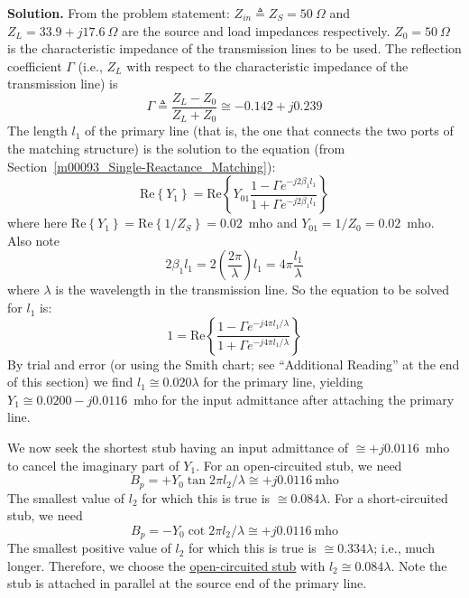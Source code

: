 \begin{example}
\begin{mdframed}[backgroundcolor=brown!20,linecolor=brown!20]
{\bf Solution.}
From the problem statement: $Z_{in} \triangleq Z_S = 50~\Omega$ and $Z_L = 33.9+j17.6~\Omega$ are the source and load impedances respectively.
$Z_0=50~\Omega$ is the characteristic impedance of the transmission lines to be used.
The reflection coefficient $\Gamma$ (i.e., $Z_L$ with respect to the characteristic impedance of the transmission line) is
%
\begin{equation}
\Gamma \triangleq \frac{Z_L - Z_0}{Z_L + Z_0} \cong -0.142 + j0.239
\end{equation} 
%
The length $l_1$ of the primary line (that is, the one that connects the two ports of the matching structure) is the solution to the equation (from Section~\ref{m00093_Single-Reactance_Matching}):
%
\begin{equation}
\mbox{Re}\left\{Y_1\right\} = \mbox{Re}\left\{Y_{01} \frac{ 1 - \Gamma e^{-j2\beta_1 l_1} }{ 1 + \Gamma e^{-j2\beta_1 l_1} }\right\}
\end{equation}
% 
where here
$\mbox{Re}\left\{Y_1\right\}=\mbox{Re}\left\{1/Z_S\right\}=0.02$~mho and 
$Y_{01} = 1/Z_0 = 0.02$~mho.
Also note
%
\begin{equation}
2\beta_1 l_1 = 2 \left(\frac{2\pi}{\lambda}\right) l_1 = 4\pi \frac{l_1}{\lambda}
\end{equation}
%
where $\lambda$ is the wavelength in the transmission line.
So the equation to be solved for $l_1$ is:
%
\begin{equation}
1 = \mbox{Re}\left\{ 
           \frac{ 1-\Gamma e^{-j4\pi l_1/\lambda } }
                { 1+\Gamma e^{-j4\pi l_1/\lambda } } \right\} 
\end{equation}
%
By trial and error (or using the Smith chart; see ``Additional Reading'' at the end of this section) we find \underline{$l_1\cong 0.020\lambda$} for the primary line, yielding $Y_1 \cong 0.0200-j0.0116$~mho for the input admittance after attaching the primary line.  

We now seek the shortest stub having an input admittance of $\cong +j0.0116$~mho to cancel the imaginary part of $Y_1$.  
For an open-circuited stub, we need
%
\begin{equation}
B_p = +Y_0 \tan{2\pi l_2/\lambda} \cong +j0.0116~\mbox{mho}
\end{equation}
%
The smallest value of $l_2$ for which this is true is $\cong 0.084\lambda$.  
For a short-circuited stub, we need
%
\begin{equation}
B_p = -Y_0 \cot{2\pi l_2/\lambda} \cong +j0.0116~\mbox{mho}
\end{equation}
%
The smallest positive value of $l_2$ for which this is true is $\cong 0.334\lambda$; i.e., much longer.  
Therefore, we choose the \underline{open-circuited stub} with \underline{$l_2\cong 0.084\lambda$}.  
Note the stub is attached in parallel at the source end of the primary line.

\end{mdframed}\end{example}

